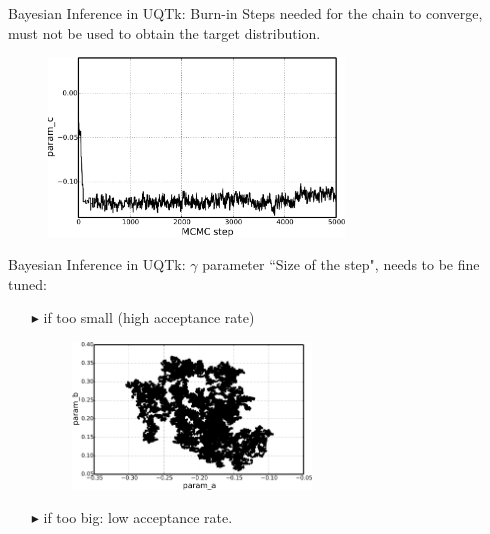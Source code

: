 \documentclass[10pt]{beamer}
\begin{document}
\begin{frame}{Bayesian Inference in UQTk: Burn-in}
	\large
	Steps needed for the chain to converge, must not be used to obtain the target
	distribution.
     \begin{figure}
         \includegraphics[width=0.7\textwidth]{burninExample}
     \end{figure}
\end{frame}

\begin{frame}{Bayesian Inference in UQTk: $\gamma$ parameter}
	\large
	``Size of the step", needs to be fine tuned:
    \begin{itemize}
    	\item[$\blacktriangleright$] if too small (high acceptance rate)
     	\begin{figure}
         	\includegraphics[width=0.6\textwidth]{smallGammaExample}
     	\end{figure}
    	
    	\item[$\blacktriangleright$] if too big: low acceptance rate.
    \end{itemize}
\end{frame}
\end{document}
